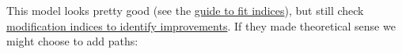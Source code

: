 \documentclass[]{article}
\newenvironment{Shaded}{\begin{snugshade}}{\end{snugshade}}
\newcommand{\DataTypeTok}[1]{\textcolor[rgb]{0.13,0.29,0.53}{#1}}
\newcommand{\DecValTok}[1]{\textcolor[rgb]{0.00,0.00,0.81}{#1}}
\newcommand{\KeywordTok}[1]{\textcolor[rgb]{0.13,0.29,0.53}{\textbf{#1}}}
\newcommand{\NormalTok}[1]{#1}
\newcommand{\OperatorTok}[1]{\textcolor[rgb]{0.81,0.36,0.00}{\textbf{#1}}}
\newcommand{\StringTok}[1]{\textcolor[rgb]{0.31,0.60,0.02}{#1}}
\begin{document}
This model looks pretty good (see the
\protect\hyperlink{common-fit-indices}{guide to fit indices}), but still check
\protect\hyperlink{model-improvement}{modification indices to identify improvements}. If they
made theoretical sense we might choose to add paths:

\begin{Shaded}
\end{Shaded}
\end{document}
